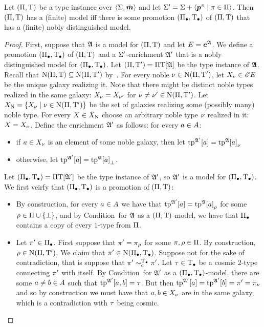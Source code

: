 \begin{lemma}\label{lem:noble-distinguishability}
Let $(\Pi,\mathrm{T})$ be a type instance over $\left\langle \mathrm{\Sigma},\bar{\bm{m}} \right\rangle$ and let
$\mathrm{\Sigma'} = \mathrm{\Sigma} + \left\langle \bm{p}^{\pi} \mathrel{}\middle|\mathrel{} \pi \in \Pi \right\rangle$.
Then $(\Pi,\mathrm{T})$ has a (finite) model iff there is some promotion
$(\Pi_{\bullet},\mathrm{T}_{\bullet})$ of $(\Pi,\mathrm{T})$ that has a (finite) nobly distinguished
model.
\end{lemma}
\begin{proof}
First, suppose that $\mathfrak{A}$ is a model for $(\Pi,\mathrm{T})$ and let $E
= \bm{e}^{\mathfrak{A}}$.
We define a promotion $(\Pi_{\bullet},\mathrm{T}_{\bullet})$ of $(\Pi,\mathrm{T})$ and
a $\mathrm{\Sigma'}$-enrichment $\mathfrak{A'}$ that is a nobly distinguished model for
$(\Pi_{\bullet},\mathrm{T}_{\bullet})$.
Let $(\Pi,{\mathrm{T}'}) = \Pi\mathrm{T}[\mathfrak{A}]$ be the type instance of $\mathfrak{A}$.
Recall that $\mathrm{\mathrm{N}}(\Pi,\mathrm{T}) \subseteq
\mathrm{\mathrm{N}}(\Pi,{\mathrm{T}'})$ by~.
For every noble $\nu \in
\mathrm{\mathrm{N}}(\Pi,{\mathrm{T}'})$, let $X_\nu \in {\mathscr{E}E}$ be the unique galaxy realizing it. Note that there might be distinct noble types
realized in the same galaxy: 
$X_\nu = X_{\nu'}$ for $\nu \neq {\nu'} \in \mathrm{\mathrm{N}}(\Pi,{\mathrm{T}'})$.
Let $X_{\mathrm{\mathrm{N}}} = \left\{X_\nu\mathrel{}\middle|\mathrel{}\nu \in \mathrm{\mathrm{N}}(\Pi,{\mathrm{T}'})\right\}$ be the set of
galaxies realizing some (possibly many) noble type. For every $X \in
X_{\mathrm{\mathrm{N}}}$ choose an arbitrary noble type $\nu$ realized in it: $X =
X_\nu$.
Define the enrichment $\mathfrak{A'}$ as follows: for every $a \in A$:
\begin{itemize}
  \item if $a \in X_\nu$ is an element of some noble galaxy, then let
$\operatorname{tp}^{\mathfrak{A'}}[a] = {\operatorname{tp}^{\mathfrak{A}}[a]}_{\nu}$
  \item otherwise, let $\operatorname{tp}^{\mathfrak{A'}}[a] = {\operatorname{tp}^{\mathfrak{A}}[a]}_{\bot}$.
\end{itemize}
Let $(\Pi_{\bullet},\mathrm{T}_{\bullet}) = \Pi\mathrm{T}[\mathfrak{A'}]$ be the type instance of $\mathfrak{A'}$, so
$\mathfrak{A'}$ is a model for $(\Pi_{\bullet},\mathrm{T}_{\bullet})$. We first veirfy that
$(\Pi_{\bullet},\mathrm{T}_{\bullet})$ is a promotion of $(\Pi,\mathrm{T})$:
\begin{itemize}
  \item[\refcondpromp]
  By construction, for every $a \in A$ we have that
  $\operatorname{tp}^{\mathfrak{A'}}[a] = {\operatorname{tp}^{\mathfrak{A}}[a]}_{\rho}$ for some $\rho \in
  \Pi\cup\left\{\bot\right\}$, and by Condition~ for $\mathfrak{A}$ as a
  $(\Pi,\mathrm{T})$-model, we have that $\Pi_{\bullet}$ contains a copy of every
  $1$-type from $\Pi$.
  \item[\refcondpromn]
  Let ${\pi'} \in \Pi_{\bullet}$.
  First suppose that ${\pi'} = {\pi}_{\rho}$ for some $\pi, \rho \in \Pi$.
  By construction, $\rho \in \mathrm{\mathrm{N}}(\Pi,{\mathrm{T}'})$. We claim that ${\pi'} \in
  \mathrm{\mathrm{N}}(\Pi_{\bullet},\mathrm{T}_{\bullet})$. Suppose not for the sake of contradiction, that is suppose
  that ${\pi'} \sim_{\mathrm{c}}^{\mathrm{T}_{\bullet}} {\pi'}$. Let $\tau \in \mathrm{T}_{\bullet}$ be a cosmic $2$-type
  connecting ${\pi'}$ with itself. By Condition~\condrealizII for $\mathfrak{A'}$ as a
  $(\Pi_{\bullet},\mathrm{T}_{\bullet})$-model, there are some $a \neq b \in A$ such that
  $\operatorname{tp}^{\mathfrak{A'}}[a,b] = \tau$. But then $\operatorname{tp}^{\mathfrak{A'}}[a] = \operatorname{tp}^{\mathfrak{A'}}[b] =
  {\pi'} = {\pi}_{\nu}$ and so by construction we must have that $a, b
  \in X_\nu$ are in the same galaxy, which is a contradiction with $\tau$
  being cosmic.
  

\end{itemize}
\end{proof}
